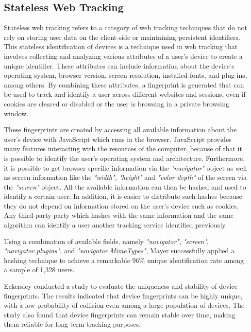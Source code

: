 \subsection{Stateless Web Tracking}
Stateless web tracking refers to a category of web tracking techniques that do not rely on storing user data on
the client-side or maintaining persistent identifiers. This stateless identification of devices is a technique used
in web tracking that involves collecting and analyzing various attributes of a user's device to create a unique identifier.
These attributes can include information about the device's operating system, browser version, screen resolution,
installed fonts, and plug-ins, among others. By combining these attributes, a fingerprint is generated that can be used to track and
identify a user across different websites and sessions, even if cookies are cleared or disabled or the user is browsing in a private 
browsing window.

These fingerprints are created by accessing all available information about the user's device with JavaScript which runs in the browser.
JavaScript provides many features interacting with the resources of the computer, because of that it is possible to identify the user's 
operating system and architecture. Furthermore, it is possible to get browser specific information via the \emph{"navigator"} object as well as 
screen information like the \emph{"width"}, \emph{"height"} and \emph{"color depth"} of the screen via the \emph{"screen"} object. All the available 
information can then be hashed and used to identify a certain user. In addition, it is easier to distribute such hashes because they do not depend 
on information stored on the user's device such as cookies. Any third-party party which hashes with the same information and the same algorithm 
can identify a user another tracking service identified previously.

Using a combination of available fields, namely \emph{"navigator"}, \emph{"screen"}, \emph{"navigator.plugins"}, and \emph{"navigator.MimeTypes"},
Mayer \cite{mayer2009any} successfully applied a hashing technique to achieve a remarkable 96\% unique identification rate among
a sample of 1,328 users.

Eckersley \cite{eckersley2010unique} conducted a study to evaluate the uniqueness and stability of
device fingerprints. The results indicated that device fingerprints can be highly unique,
with a low probability of collision even among a large population of devices. The study also found
that device fingerprints can remain stable over time, making them reliable for long-term tracking purposes.

